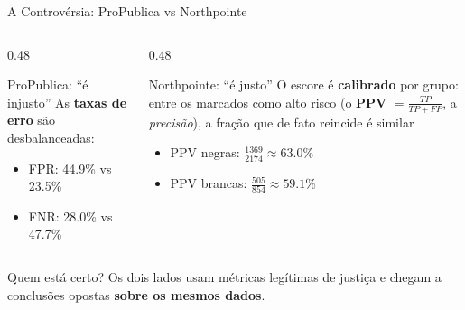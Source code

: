 \documentclass[aspectratio=169,xcolor=dvipsnames]{beamer}
\begin{document}
  \begin{frame}{A Controvérsia: ProPublica vs Northpointe}
    \begin{columns}[T]
      \begin{column}{0.48\textwidth}
        \begin{alertblock}{ProPublica: \enquote{é injusto}}
          As \textbf{taxas de erro} são desbalanceadas:
          \begin{itemize}\setlength{\itemsep}{0pt}
            \item FPR: 44.9\% vs 23.5\%
            \item FNR: 28.0\% vs 47.7\%
          \end{itemize}
        \end{alertblock}
      \end{column}
      \begin{column}{0.48\textwidth}
        \begin{block}{Northpointe: \enquote{é justo}}
          O escore é \textbf{calibrado} por grupo: entre os marcados como alto risco (o \textbf{PPV} $=\frac{TP}{TP+FP}$, a \textit{precisão}), a fração que de fato reincide é similar
          \begin{itemize}\setlength{\itemsep}{0pt}
            \item PPV negras: $\frac{1369}{2174} \approx 63.0\%$
            \item PPV brancas: $\frac{505}{854} \approx 59.1\%$
          \end{itemize}
        \end{block}
      \end{column}
    \end{columns}

    \vspace{0.5em}
    \begin{block}{Quem está certo?}
      Os dois lados usam métricas legítimas de justiça e chegam a conclusões opostas \textbf{sobre os mesmos dados}.
    \end{block}
  \end{frame}

\end{document}
